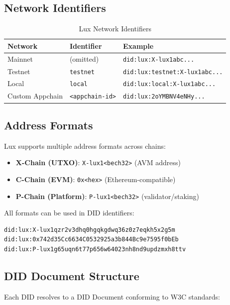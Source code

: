 \documentclass[11pt,a4paper]{article}
\begin{document}
\subsection{Network Identifiers}

\begin{table}[h]
\centering
\begin{tabular}{@{}lll@{}}
\toprule
\textbf{Network} & \textbf{Identifier} & \textbf{Example} \\ \midrule
Mainnet & (omitted) & \texttt{did:lux:X-lux1abc...} \\
Testnet & \texttt{testnet} & \texttt{did:lux:testnet:X-lux1abc...} \\
Local & \texttt{local} & \texttt{did:lux:local:X-lux1abc...} \\
Custom Appchain & \texttt{<appchain-id>} & \texttt{did:lux:2oYMBNV4eNHy...} \\ \bottomrule
\end{tabular}
\caption{Lux Network Identifiers}
\end{table}

\subsection{Address Formats}

Lux supports multiple address formats across chains:

\begin{itemize}
  \item \textbf{X-Chain (UTXO)}: \texttt{X-lux1<bech32>} (AVM address)
  \item \textbf{C-Chain (EVM)}: \texttt{0x<hex>} (Ethereum-compatible)
  \item \textbf{P-Chain (Platform)}: \texttt{P-lux1<bech32>} (validator/staking)
\end{itemize}

All formats can be used in DID identifiers:

\begin{lstlisting}[language=bash, caption=Valid Lux DIDs]
did:lux:X-lux1qzr2v3dhq0hgqkgdwq36z0z7eqkh5x2g5m
did:lux:0x742d35Cc6634C0532925a3b844Bc9e7595f0bEb
did:lux:P-lux1g65uqn6t77p656w64023nh8nd9updzmxh8ttv
\end{lstlisting}

\subsection{DID Document Structure}

Each DID resolves to a DID Document conforming to W3C standards:
\end{document}
